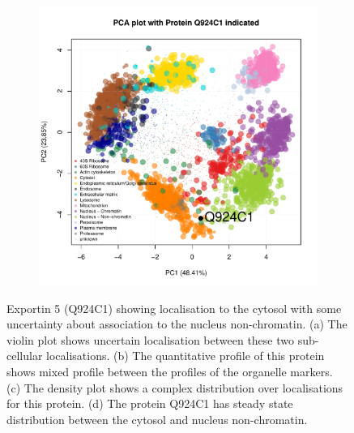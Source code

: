 \documentclass[12pt,english]{article}\usepackage[]{graphicx}\usepackage[]{color}
\makeatletter
\def\maxwidth{ %
  \ifdim\Gin@nat@width>\linewidth
    \linewidth
  \else
    \Gin@nat@width
  \fi
}
\newenvironment{knitrout}{}{} %
\makeatother
\begin{document}
\begin{figure}[p]
\begin{subfigure}[t]{0.5\textwidth}
\begin{knitrout}
{}



\end{knitrout}
    \caption{}
  \end{subfigure}%
  \begin{subfigure}[t]{0.5\textwidth}
    \centering
\begin{knitrout}
\color{fgcolor}
\includegraphics[width=\maxwidth]{figure/Q924C1-pca-1} 

\end{knitrout}
    \caption{}
  \end{subfigure}

  \caption{Exportin 5 (Q924C1) showing localisation to the cytosol
    with some uncertainty about association to the nucleus
    non-chromatin.  (a) The violin plot shows uncertain localisation
    between these two sub-cellular localisations. (b) The quantitative
    profile of this protein shows mixed profile between the profiles
    of the organelle markers. (c) The density plot shows a complex
    distribution over localisations for this protein. (d) The protein
    Q924C1 has steady state distribution between the cytosol and
    nucleus non-chromatin.}
  \label{fig:Q924C1}
\end{figure}
\end{document}
